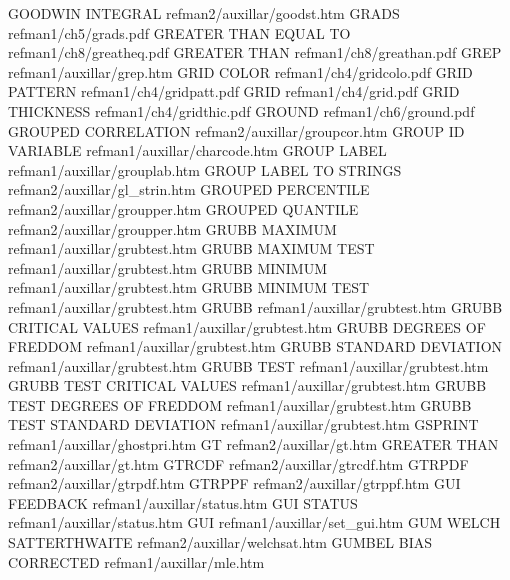 GOODWIN INTEGRAL                        refman2/auxillar/goodst.htm
GRADS                                   refman1/ch5/grads.pdf
GREATER THAN EQUAL TO                   refman1/ch8/greatheq.pdf
GREATER THAN                            refman1/ch8/greathan.pdf
GREP                                    refman1/auxillar/grep.htm
GRID COLOR                              refman1/ch4/gridcolo.pdf
GRID PATTERN                            refman1/ch4/gridpatt.pdf
GRID                                    refman1/ch4/grid.pdf
GRID THICKNESS                          refman1/ch4/gridthic.pdf
GROUND                                  refman1/ch6/ground.pdf
GROUPED CORRELATION                     refman2/auxillar/groupcor.htm
GROUP ID VARIABLE                       refman1/auxillar/charcode.htm
GROUP LABEL                             refman1/auxillar/grouplab.htm
GROUP LABEL TO STRINGS                  refman2/auxillar/gl_strin.htm
GROUPED PERCENTILE                      refman2/auxillar/groupper.htm
GROUPED QUANTILE                        refman2/auxillar/groupper.htm
GRUBB MAXIMUM                           refman1/auxillar/grubtest.htm
GRUBB MAXIMUM TEST                      refman1/auxillar/grubtest.htm
GRUBB MINIMUM                           refman1/auxillar/grubtest.htm
GRUBB MINIMUM TEST                      refman1/auxillar/grubtest.htm
GRUBB                                   refman1/auxillar/grubtest.htm
GRUBB CRITICAL VALUES                   refman1/auxillar/grubtest.htm
GRUBB DEGREES OF FREDDOM                refman1/auxillar/grubtest.htm
GRUBB STANDARD DEVIATION                refman1/auxillar/grubtest.htm
GRUBB TEST                              refman1/auxillar/grubtest.htm
GRUBB TEST CRITICAL VALUES              refman1/auxillar/grubtest.htm
GRUBB TEST DEGREES OF FREDDOM           refman1/auxillar/grubtest.htm
GRUBB TEST STANDARD DEVIATION           refman1/auxillar/grubtest.htm
GSPRINT                                 refman1/auxillar/ghostpri.htm
GT                                      refman2/auxillar/gt.htm
GREATER THAN                            refman2/auxillar/gt.htm
GTRCDF                                  refman2/auxillar/gtrcdf.htm
GTRPDF                                  refman2/auxillar/gtrpdf.htm
GTRPPF                                  refman2/auxillar/gtrppf.htm
GUI FEEDBACK                            refman1/auxillar/status.htm
GUI STATUS                              refman1/auxillar/status.htm
GUI                                     refman1/auxillar/set_gui.htm
GUM WELCH SATTERTHWAITE                 refman2/auxillar/welchsat.htm
GUMBEL BIAS CORRECTED                   refman1/auxillar/mle.htm
